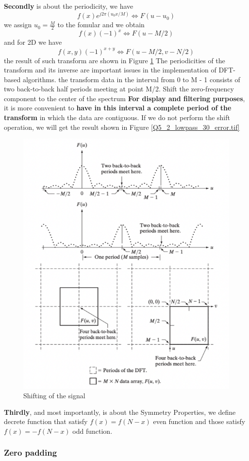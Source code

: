 \documentclass[
	12pt, %
]{style/fphw}
\begin{document}
\textbf{Secondly} is about the periodicity, we have $$f(x)e^{j2\pi (u_0x/M)} \Leftrightarrow F(u-u_0)$$ we assign $u_0 = \frac{M}{2}$ to the fomular and we obtain $$f(x)(-1)^{x} \Leftrightarrow F(u-M/2)$$ and for 2D we have $$f(x,y)(-1)^{x+y} \Leftrightarrow F(u-M/2, v-N/2)$$ the result of such transform are shown in Figure \ref{shift.png} The periodicities of the transform and its inverse are important issues in the implementation of DFT-based algorithms. the transform data in the interval from 0 to M - 1 consists of two back-to-back half periods meeting at point M/2. Shift the zero-frequency component to the center of the spectrum \textbf{For display and filtering purposes}, it is more convenient to \textbf{have in this interval a complete period of the transform} in which the data are contiguous. If we do not perform the shift operation, we will get the result shown in Figure \ref{Q5_2_lowpass_30_error.tif}

\begin{figure}[H]
    \centering
    \includegraphics[width=0.6\linewidth]{chart/shift.png}
    \caption{Shifting of the signal}
    \label{shift.png}
\end{figure}

\textbf{Thirdly}, and most importantly, is about the Symmetry Properties, we define decrete function that satisfy $f(x)=f(N - x)$ even function and those satisfy $f(x)= -f(N - x)$ odd function.

\subsubsection*{Zero padding}
\end{document}
